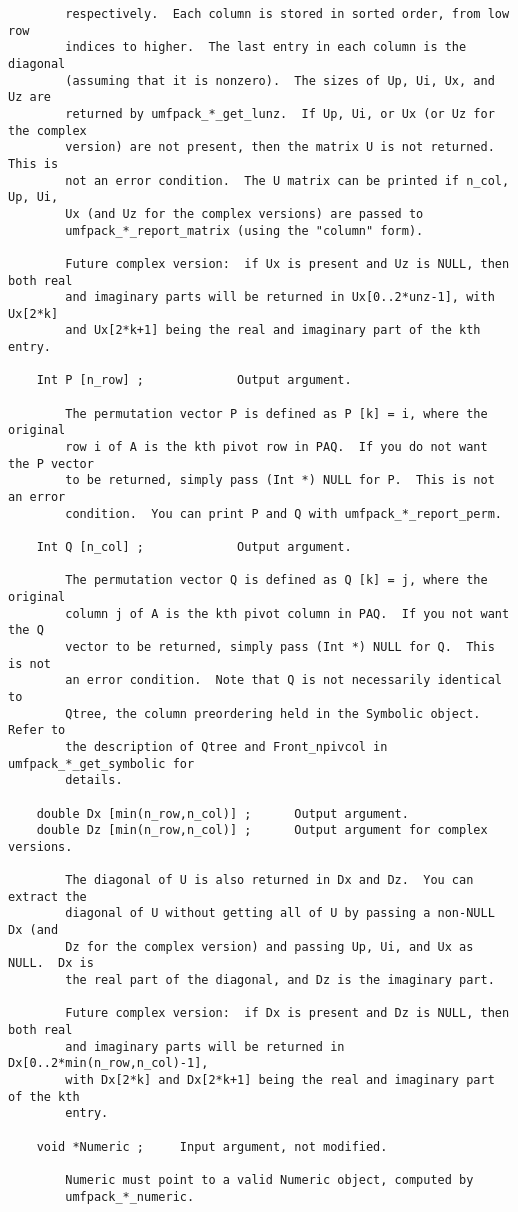 {\begin{verbatim}
        respectively.  Each column is stored in sorted order, from low row
        indices to higher.  The last entry in each column is the diagonal
        (assuming that it is nonzero).  The sizes of Up, Ui, Ux, and Uz are
        returned by umfpack_*_get_lunz.  If Up, Ui, or Ux (or Uz for the complex
        version) are not present, then the matrix U is not returned.  This is
        not an error condition.  The U matrix can be printed if n_col, Up, Ui,
        Ux (and Uz for the complex versions) are passed to
        umfpack_*_report_matrix (using the "column" form).

        Future complex version:  if Ux is present and Uz is NULL, then both real
        and imaginary parts will be returned in Ux[0..2*unz-1], with Ux[2*k]
        and Ux[2*k+1] being the real and imaginary part of the kth entry.

    Int P [n_row] ;             Output argument.

        The permutation vector P is defined as P [k] = i, where the original
        row i of A is the kth pivot row in PAQ.  If you do not want the P vector
        to be returned, simply pass (Int *) NULL for P.  This is not an error
        condition.  You can print P and Q with umfpack_*_report_perm.

    Int Q [n_col] ;             Output argument.

        The permutation vector Q is defined as Q [k] = j, where the original
        column j of A is the kth pivot column in PAQ.  If you not want the Q
        vector to be returned, simply pass (Int *) NULL for Q.  This is not
        an error condition.  Note that Q is not necessarily identical to
        Qtree, the column preordering held in the Symbolic object.  Refer to
        the description of Qtree and Front_npivcol in umfpack_*_get_symbolic for
        details.

    double Dx [min(n_row,n_col)] ;      Output argument.
    double Dz [min(n_row,n_col)] ;      Output argument for complex versions.

        The diagonal of U is also returned in Dx and Dz.  You can extract the
        diagonal of U without getting all of U by passing a non-NULL Dx (and
        Dz for the complex version) and passing Up, Ui, and Ux as NULL.  Dx is
        the real part of the diagonal, and Dz is the imaginary part.

        Future complex version:  if Dx is present and Dz is NULL, then both real
        and imaginary parts will be returned in Dx[0..2*min(n_row,n_col)-1],
        with Dx[2*k] and Dx[2*k+1] being the real and imaginary part of the kth
        entry.

    void *Numeric ;     Input argument, not modified.

        Numeric must point to a valid Numeric object, computed by
        umfpack_*_numeric.
\end{verbatim}
}

